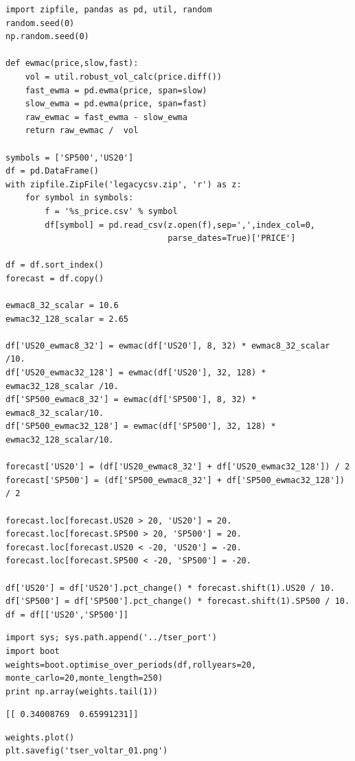 \documentclass[12pt,fleqn]{article}\usepackage{../../common}
\begin{document}
\begin{verbatim}
import zipfile, pandas as pd, util, random
random.seed(0)
np.random.seed(0)

def ewmac(price,slow,fast):
    vol = util.robust_vol_calc(price.diff())
    fast_ewma = pd.ewma(price, span=slow)
    slow_ewma = pd.ewma(price, span=fast)
    raw_ewmac = fast_ewma - slow_ewma
    return raw_ewmac /  vol 

symbols = ['SP500','US20']
df = pd.DataFrame()
with zipfile.ZipFile('legacycsv.zip', 'r') as z:
    for symbol in symbols:
        f = '%s_price.csv' % symbol
        df[symbol] = pd.read_csv(z.open(f),sep=',',index_col=0,
                                 parse_dates=True)['PRICE']
    
df = df.sort_index()
forecast = df.copy()

ewmac8_32_scalar = 10.6 
ewmac32_128_scalar = 2.65

df['US20_ewmac8_32'] = ewmac(df['US20'], 8, 32) * ewmac8_32_scalar /10. 
df['US20_ewmac32_128'] = ewmac(df['US20'], 32, 128) * ewmac32_128_scalar /10. 
df['SP500_ewmac8_32'] = ewmac(df['SP500'], 8, 32) * ewmac8_32_scalar/10.
df['SP500_ewmac32_128'] = ewmac(df['SP500'], 32, 128) * ewmac32_128_scalar/10.

forecast['US20'] = (df['US20_ewmac8_32'] + df['US20_ewmac32_128']) / 2
forecast['SP500'] = (df['SP500_ewmac8_32'] + df['SP500_ewmac32_128']) / 2

forecast.loc[forecast.US20 > 20, 'US20'] = 20.
forecast.loc[forecast.SP500 > 20, 'SP500'] = 20.
forecast.loc[forecast.US20 < -20, 'US20'] = -20.
forecast.loc[forecast.SP500 < -20, 'SP500'] = -20.

df['US20'] = df['US20'].pct_change() * forecast.shift(1).US20 / 10.
df['SP500'] = df['SP500'].pct_change() * forecast.shift(1).SP500 / 10.
df = df[['US20','SP500']]
\end{verbatim}


\begin{verbatim}
import sys; sys.path.append('../tser_port')
import boot
weights=boot.optimise_over_periods(df,rollyears=20, monte_carlo=20,monte_length=250)
print np.array(weights.tail(1))
\end{verbatim}

\begin{verbatim}
[[ 0.34008769  0.65991231]]
\end{verbatim}

\begin{verbatim}
weights.plot()
plt.savefig('tser_voltar_01.png')
\end{verbatim}
\end{document}
